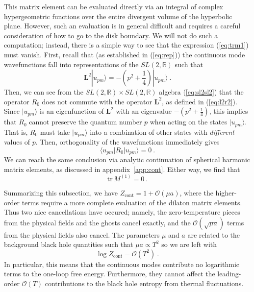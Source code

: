 \documentclass[12pt]{article}
\begin{document}
This matrix element can be evaluated directly via an integral of complex hypergeometric functions over the entire divergent volume of the hyperbolic plane.  However, such an evaluation is in general difficult and requires a careful consideration of how to go to the disk boundary.  We will not do such a computation; instead, there is a simple way to see that the expression (\ref{eq:trm1}) must vanish.  First, recall that (as established in (\ref{eq:rep})) the continuous mode wavefunctions fall into representations of the $SL(2,\mathbb{R})$ such that
\begin{equation}
	\mathbf{L}^2 | u_{pm}\rangle = - \left(p^2 + \frac{1}{4}\right) |u_{pm}\rangle~.
\end{equation}
Then, we can see from the $SL(2,\mathbb{R}) \times SL(2,\mathbb{R})$ algebra (\ref{eq:sl2sl2}) that the operator $R_0$ does not commute with the operator $\mathbf{L}^2$, as defined in (\ref{eq:l2r2}).  Since $|u_{pm}\rangle$ is an eigenfunction of $\mathbf{L}^2$ with an eigenvalue $-(p^2 + \frac{1}{4})$, this implies that $R_0$ cannot preserve the quantum number $p$ when acting on the states $|u_{pm}\rangle$.  That is, $R_0$ must take $|u_{pm}\rangle$ into a combination of other states with \emph{different} values of $p$.  Then, orthogonality of the wavefunctions immediately gives
\begin{equation}
	\langle u_{pm} | R_0 | u_{pm}\rangle = 0~.
\label{eq:r0vanish}
\end{equation}
We can reach the same conclusion via analytic continuation of spherical harmonic matrix elements, as discussed in appendix~\ref{app:cont}.  Either way, we find that
\begin{equation}
	\text{tr}\,M^{(1)} = 0~.
\end{equation}

Summarizing this subsection, we  have $Z_\text{cont} = 1 + \mathcal{O}(\mu a)$, where the higher-order terms require a more complete evaluation of the dilaton matrix elements.  Thus two nice cancellations have occured; namely, the zero-temperature pieces from the physical fields and the ghosts cancel exactly, and the $\mathcal{O}(\sqrt{\mu a})$ terms from the physical fields also cancel. The parameters $\mu$ and $a$ are related to the background black hole quantities such that $\mu a \propto T^2$ so
we are left with
\begin{equation}
	\log Z_\text{cont} = \mathcal{O}(T^2)~.
\end{equation}
In particular, this means that the continuous modes contribute no logarithmic terms to the one-loop free energy. Furthermore, they 
cannot affect the leading-order $\mathcal{O}(T)$ contributions to the black hole entropy from thermal fluctuations.
\end{document}
